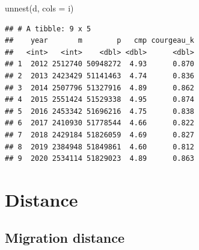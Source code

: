 \documentclass[
]{book}
\newenvironment{Shaded}{\begin{snugshade}}{\end{snugshade}}
\newcommand{\AttributeTok}[1]{\textcolor[rgb]{0.77,0.63,0.00}{#1}}
\newcommand{\FunctionTok}[1]{\textcolor[rgb]{0.00,0.00,0.00}{#1}}
\newcommand{\NormalTok}[1]{#1}
\begin{document}
\begin{Shaded}
\begin{Highlighting}[]
\FunctionTok{unnest}\NormalTok{(d, }\AttributeTok{cols =}\NormalTok{ i)}
\end{Highlighting}
\end{Shaded}

\begin{verbatim}
## # A tibble: 9 x 5
##    year       m        p   cmp courgeau_k
##   <int>   <int>    <dbl> <dbl>      <dbl>
## 1  2012 2512740 50948272  4.93      0.870
## 2  2013 2423429 51141463  4.74      0.836
## 3  2014 2507796 51327916  4.89      0.862
## 4  2015 2551424 51529338  4.95      0.874
## 5  2016 2453342 51696216  4.75      0.838
## 6  2017 2410930 51778544  4.66      0.822
## 7  2018 2429184 51826059  4.69      0.827
## 8  2019 2384948 51849861  4.60      0.812
## 9  2020 2534114 51829023  4.89      0.863
\end{verbatim}

\hypertarget{distance}{%
\section{Distance}\label{distance}}

\hypertarget{migration-distance}{%
\subsection{Migration distance}\label{migration-distance}}
\end{document}
